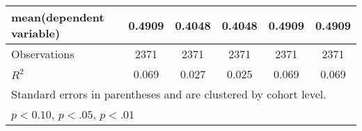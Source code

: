 \begin{table}[htbp]
\begin{adjustbox}{max width=0.59\textwidth}
\begin{tabular}{l*{5}{c}}
\hline
mean(dependent variable)  &        0.4909         &        0.4048         &             0.4048         &         0.4909         &         0.4909         \\
\hline
Observations       &        2371         &        2371         &        2371         &        2371         &        2371         \\
\(R^{2}\)   &       0.069         &       0.027         &       0.025         &       0.069         &       0.069         \\
\hline\hline
\multicolumn{6}{l}{\footnotesize Standard errors in parentheses and are clustered by cohort level.}\\
\multicolumn{6}{l}{\footnotesize \sym{*} \(p<0.10\), \sym{**} \(p<.05\), \sym{***} \(p<.01\)}\\
\end{tabular}%
	\end{adjustbox}
\end{table}